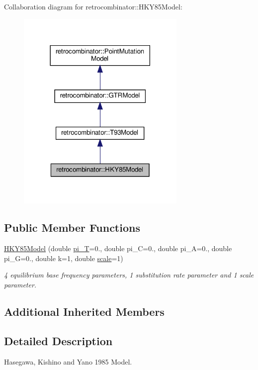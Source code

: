 Collaboration diagram for retrocombinator\+:\+:H\+K\+Y85\+Model\+:\nopagebreak
\begin{figure}[H]
\begin{center}
\leavevmode
\includegraphics[width=230pt]{classretrocombinator_1_1HKY85Model__coll__graph}
\end{center}
\end{figure}
\subsection*{Public Member Functions}
\begin{DoxyCompactItemize}
\item 
\hyperlink{classretrocombinator_1_1HKY85Model_a2f4a296cdc444c92b54a4d972b044cdb}{H\+K\+Y85\+Model} (double \hyperlink{classretrocombinator_1_1GTRModel_ab002dbc62f8e8fbfc94558dd94166bd8}{pi\+\_\+T}=0., double pi\+\_\+C=0., double pi\+\_\+A=0., double pi\+\_\+G=0., double k=1, double \hyperlink{classretrocombinator_1_1PointMutationModel_a3258dfbdae0f2614cdc66f13ae028b46}{scale}=1)
\begin{DoxyCompactList}\small\item\em 4 equilibrium base frequency parameters, 1 substitution rate parameter and 1 scale parameter. \end{DoxyCompactList}\end{DoxyCompactItemize}
\subsection*{Additional Inherited Members}


\subsection{Detailed Description}
Hasegawa, Kishino and Yano 1985 Model. 

